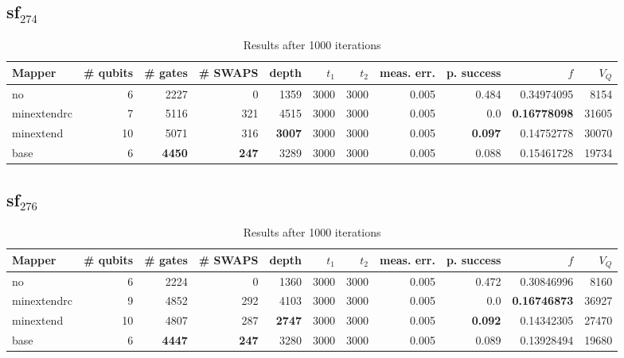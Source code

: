 \documentclass[11pt]{article}
\begin{document}
\subsection{sf\(_{\text{274}}\)}
\label{sec:org54745c2}
\begin{table}[H]
\caption{\label{tab:org1175234}
Results after 1000 iterations}
\centering
\small
\begin{tabular}{lrrrrrrrrrr}
\hline
Mapper & \# qubits & \# gates & \# SWAPS & depth & \(t_1\) & \(t_2\) & meas. err. & p. success & \(f\) & \(V_Q\)\\
\hline
no & 6 & 2227 & 0 & 1359 & 3000 & 3000 & 0.005 & 0.484 & 0.34974095 & 8154\\
\hline
minextendrc & 7 & 5116 & 321 & 4515 & 3000 & 3000 & 0.005 & 0.0 & \textbf{0.16778098} & 31605\\
minextend & 10 & 5071 & 316 & \textbf{3007} & 3000 & 3000 & 0.005 & \textbf{0.097} & 0.14752778 & 30070\\
base & 6 & \textbf{4450} & \textbf{247} & 3289 & 3000 & 3000 & 0.005 & 0.088 & 0.15461728 & 19734\\
\hline
\end{tabular}
\end{table}
\subsection{sf\(_{\text{276}}\)}
\label{sec:orge2ef7c8}
\begin{table}[H]
\caption{\label{tab:org5252e1f}
Results after 1000 iterations}
\centering
\small
\begin{tabular}{lrrrrrrrrrr}
\hline
Mapper & \# qubits & \# gates & \# SWAPS & depth & \(t_1\) & \(t_2\) & meas. err. & p. success & \(f\) & \(V_Q\)\\
\hline
no & 6 & 2224 & 0 & 1360 & 3000 & 3000 & 0.005 & 0.472 & 0.30846996 & 8160\\
\hline
minextendrc & 9 & 4852 & 292 & 4103 & 3000 & 3000 & 0.005 & 0.0 & \textbf{0.16746873} & 36927\\
minextend & 10 & 4807 & 287 & \textbf{2747} & 3000 & 3000 & 0.005 & \textbf{0.092} & 0.14342305 & 27470\\
base & 6 & \textbf{4447} & \textbf{247} & 3280 & 3000 & 3000 & 0.005 & 0.089 & 0.13928494 & 19680\\
\hline
\end{tabular}
\end{table}
\end{document}
